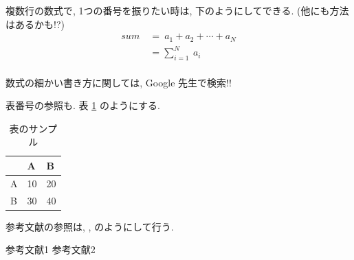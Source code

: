 \documentclass[a4paper,11pt]{jsarticle}
\begin{document}
    複数行の数式で, 1つの番号を振りたい時は, 下のようにしてできる. (他にも方法はあるかも!?)\\
    \begin{equation}
      \begin{split}
        sum \ &= \ a_{1} + a_{2} + \cdots + a_{N} \\
        &= \sum_{i=1}^{N} \ a_{i}
        \label{eq:sample-formula2}
      \end{split}
    \end{equation}\\

    数式の細かい書き方に関しては, Google 先生で検索!! \\
    
    \par
  
      表番号の参照も. 表 \ref{table:sample-table} のようにする. \\ 
      \begin{table}[htbp]
        \caption{表のサンプル} %
        \label{table:sample-table}
        \centering
        \begin{tabular}{l|ll}
            & A  & B  \\ \hline
          A & 10 & 20 \\
          B & 30 & 40
        \end{tabular}
      \end{table}

      \par

      参考文献の参照は, \cite{References1} , \cite{References2} のようにして行う. \\

      \par



    \begin{thebibliography}{99}
        参考文献1
        参考文献2
        
    \end{thebibliography}
\end{document}
